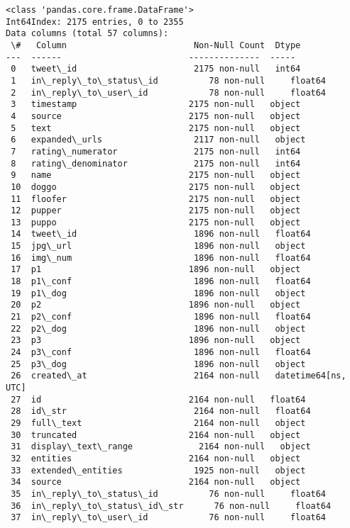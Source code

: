 \documentclass[11pt]{article}
\begin{document}
    \begin{Verbatim}[commandchars=\\\{\}]
<class 'pandas.core.frame.DataFrame'>
Int64Index: 2175 entries, 0 to 2355
Data columns (total 57 columns):
 \#   Column                         Non-Null Count  Dtype
---  ------                         --------------  -----
 0   tweet\_id                       2175 non-null   int64
 1   in\_reply\_to\_status\_id          78 non-null     float64
 2   in\_reply\_to\_user\_id            78 non-null     float64
 3   timestamp                      2175 non-null   object
 4   source                         2175 non-null   object
 5   text                           2175 non-null   object
 6   expanded\_urls                  2117 non-null   object
 7   rating\_numerator               2175 non-null   int64
 8   rating\_denominator             2175 non-null   int64
 9   name                           2175 non-null   object
 10  doggo                          2175 non-null   object
 11  floofer                        2175 non-null   object
 12  pupper                         2175 non-null   object
 13  puppo                          2175 non-null   object
 14  tweet\_id                       1896 non-null   float64
 15  jpg\_url                        1896 non-null   object
 16  img\_num                        1896 non-null   float64
 17  p1                             1896 non-null   object
 18  p1\_conf                        1896 non-null   float64
 19  p1\_dog                         1896 non-null   object
 20  p2                             1896 non-null   object
 21  p2\_conf                        1896 non-null   float64
 22  p2\_dog                         1896 non-null   object
 23  p3                             1896 non-null   object
 24  p3\_conf                        1896 non-null   float64
 25  p3\_dog                         1896 non-null   object
 26  created\_at                     2164 non-null   datetime64[ns, UTC]
 27  id                             2164 non-null   float64
 28  id\_str                         2164 non-null   float64
 29  full\_text                      2164 non-null   object
 30  truncated                      2164 non-null   object
 31  display\_text\_range             2164 non-null   object
 32  entities                       2164 non-null   object
 33  extended\_entities              1925 non-null   object
 34  source                         2164 non-null   object
 35  in\_reply\_to\_status\_id          76 non-null     float64
 36  in\_reply\_to\_status\_id\_str      76 non-null     float64
 37  in\_reply\_to\_user\_id            76 non-null     float64

\end{Verbatim}
\end{document}
